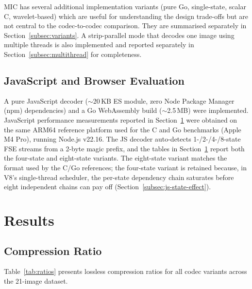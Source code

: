\documentclass[journal]{IEEEtran}
\begin{document}
MIC has several additional implementation variants (pure Go, single-state,
scalar C, wavelet-based) which are useful for understanding the design
trade-offs but are not central to the codec-to-codec comparison. They are
summarised separately in Section~\ref{subsec:variants}. A strip-parallel
mode that decodes one image using multiple threads is also implemented and
reported separately in Section~\ref{subsec:multithread} for completeness.


\subsection{JavaScript and Browser Evaluation}

A pure JavaScript decoder (${\sim}$20\,KB ES module, zero Node Package Manager
(npm) dependencies) and a Go WebAssembly build (${\sim}$2.5\,MB) were
implemented. JavaScript performance measurements reported in
Section~\ref{sec:results} were obtained on the same ARM64 reference
platform used for the C and Go benchmarks (Apple M4 Pro), running
Node.js v22.16. The JS decoder auto-detects 1-/2-/4-/8-state FSE
streams from a 2-byte magic prefix, and the tables in
Section~\ref{sec:results} report both the four-state and eight-state
variants. The eight-state variant matches the format used by the C/Go
references; the four-state variant is retained because, in V8's
single-thread scheduler, the per-state dependency chain saturates
before eight independent chains can pay off
(Section~\ref{subsec:js-state-effect}).

\section{Results}
\label{sec:results}

\subsection{Compression Ratio}

Table~\ref{tab:ratios} presents lossless compression ratios for all codec
variants across the 21-image dataset.
\end{document}
